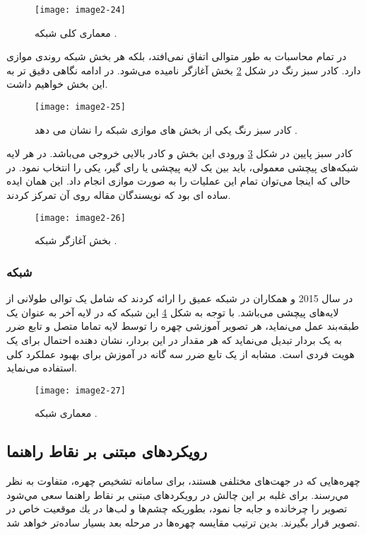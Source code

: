 \begin{figure}[h]
\centering
  \texttt{[image: image2-24]}
  \caption{معماری کلی شبکه  \cite{7298594}.}
  \label{image2-24}
\end{figure}

\noindent
در  تمام محاسبات به طور متوالی اتفاق نمی‌افتد، بلکه هر بخش شبکه روندی موازی دارد. کادر سبز رنگ در شکل \ref{image2-25} بخش آغازگر نامیده می‌شود. در ادامه نگاهی دقیق تر به این بخش خواهیم داشت.
 
\begin{figure}[h]
\centering
  \texttt{[image: image2-25]}
  \caption{کادر سبز رنگ یکی از بخش های موازی شبکه را نشان می دهد \cite{7298594}.}
  \label{image2-25}
\end{figure}

\noindent
کادر سبز پایین در شکل \ref{image2-26} ورودی این بخش و کادر بالایی خروجی می‌باشد. در هر لایه شبکه‌های پیچشی معمولی، باید بین یک لایه پیچشی یا رای گیر، یکی را انتخاب نمود. در حالی که اینجا می‌توان تمام این عملیات را به صورت موازی انجام داد. این همان ایده ساده ای بود که نویسندگان مقاله روی آن تمرکز کردند.

\begin{figure}[h]
\centering
  \texttt{[image: image2-26]}
  \caption{بخش آغازگر شبکه  \cite{7298594}.}
  \label{image2-26}
\end{figure}

\subsubsection{	شبکه }
در سال 2015  و همکاران در \cite{parkhi2015deep} شبکه عمیق  را ارائه کردند که شامل یک توالی طولانی از لایه‌های پیچشی می‌باشد. با توجه به شکل \ref{image2-27} این شبکه که در لایه آخر به عنوان یک طبقه‌بند عمل می‌نماید، هر تصویر آموزشی چهره را توسط لایه تماما متصل و تابع ضرر  به یک بردار تبدیل می‌نماید که هر مقدار در این بردار، نشان دهنده احتمال برای یک هویت فردی است.  مشابه  از یک تابع ضرر سه گانه  در آموزش برای بهبود عملکرد کلی استفاده می‌نماید.
 
 \begin{figure}[h]
\centering
  \texttt{[image: image2-27]}
  \caption{معماری شبکه  \cite{parkhi2015deep}.}
  \label{image2-27}
\end{figure}

 \subsection{رویکردهای مبتنی بر نقاط راهنما} 
چهره‌هايى كه در جهت‌هاى مختلفى هستند، براى سامانه تشخیص چهره، متفاوت به نظر مي‌رسند. براى غلبه بر اين چالش در رویکردهای مبتنی بر نقاط راهنما سعى مي‌شود تصوير را چرخانده و جابه جا نمود، بطوريكه چشم‌ها و لب‌ها در يك موقعيت خاص در تصوير قرار بگیرند. بدین ترتیب مقايسه چهره‌ها در مرحله بعد بسيار ساده‌تر خواهد شد.

